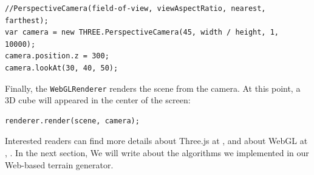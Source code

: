 \begin{lstlisting}
//PerspectiveCamera(field-of-view, viewAspectRatio, nearest, farthest);
var camera = new THREE.PerspectiveCamera(45, width / height, 1, 10000);
camera.position.z = 300;
camera.lookAt(30, 40, 50);
\end{lstlisting}

Finally, the \texttt{WebGLRenderer} renders the scene from the camera. At this point, a 3D cube will appeared in the center of the screen:

\begin{lstlisting}
renderer.render(scene, camera);
\end{lstlisting} 
  
Interested readers can find more details about Three.js at \cite{threeJS}, and about WebGL at \cite{wiki:webgl}, \cite{learningWebGL}. In the next section, We will write about the algorithms we implemented in our Web-based terrain generator.

